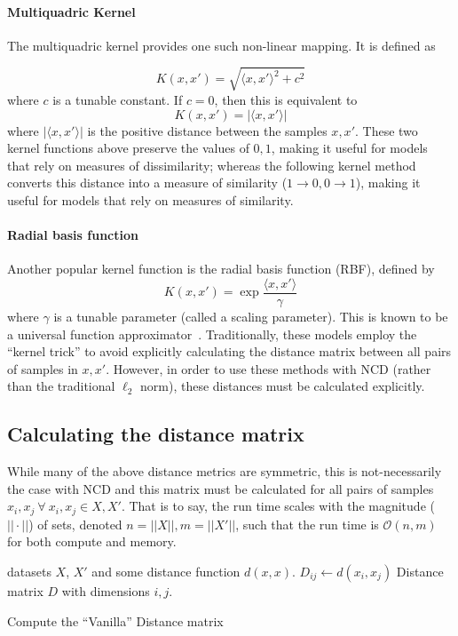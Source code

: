 \documentclass[conference]{IEEEtran}
\begin{document}
\paragraph{Multiquadric Kernel}
\label{multiquadric_kernel}
The multiquadric kernel provides one such non-linear mapping. 
It is defined as 

$$
K(x, x') = \sqrt{\langle x, x' \rangle ^2 + c^2}
$$
where $c$ is a tunable constant. 
If $c=0$, then this is equivalent to
$$
K(x, x') = | \langle x, x' \rangle|
$$
where $| \langle x, x' \rangle |$ is the positive distance between the samples $x, x'$. 
These two kernel functions above preserve the values of $0,1$, making it useful for models that rely on measures of dissimilarity; whereas the following kernel method converts this distance into a measure of similarity ($1 \rightarrow 0, 0 \rightarrow 1$), making it useful for models that rely on measures of similarity.

\paragraph{Radial basis function}
\label{rbf_kernel}
Another popular kernel function is the radial basis function (RBF), defined by
$$
K(x, x') = \exp{\frac{\langle x, x' \rangle}{\gamma}}
$$
where $\gamma$ is a tunable parameter (called a scaling parameter). 
This is known to be a universal function approximator~\cite{}. 
Traditionally, these models employ the ``kernel trick'' to avoid explicitly calculating the distance matrix between all pairs of samples in $x,x'$. 
However, in order to use these methods with NCD (rather than the traditional $\ell_2$ norm), these distances must be calculated explicitly. 

\subsection{Calculating the distance matrix}
\label{gram_matrix}
While many of the above distance metrics are symmetric, this is not-necessarily the case with NCD and this matrix must be calculated for all pairs of samples $x_i, x_j~\forall~x_i,x_j \in X, X'$. 
That is to say, the run time scales with the magnitude ($ || \cdot || $) of sets, denoted $n = || X ||, m = || X' ||$, such that the run time is $\mathcal{O}(n,m)$ for both compute and memory.
\begin{algorithm}
    \begin{algorithmic}
        \Require datasets $X$, $X'$ and some distance function $d(x,x)$.
                \State $D_{ij} \gets d(x_i, x_j)$
            \EndFor
        \EndFor
        \State \Return Distance matrix $D$ with dimensions $i,j$.
    \end{algorithmic}
    \caption{Compute the ``Vanilla'' Distance matrix}
    \label{alg:vanilla}
\end{algorithm}
\end{document}
